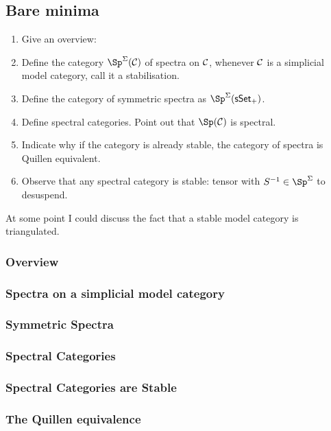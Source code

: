 \documentclass[11pt]{article}
\begin{document}
\begin{MichaelStableModelCats}
\subsection*{Bare minima}
\begin{enumerate}\squishlist
\item Give an overview:
\item Define the category $\Sp^\Sigma(\calC)$ of spectra on $\mathcal{C}$, whenever $\mathcal{C}$ is a simplicial model category, call it a stabilisation.
\item Define the category of symmetric spectra as $\Sp^\Sigma(\sSet_+)$.
\item Define spectral categories. Point out that $\Sp(\calC)$ is spectral.
\item Indicate why if the category is already stable, the category of spectra is Quillen equivalent.
\item Observe that any spectral category is stable: tensor with $S^{-1}\in\Sp^\Sigma$ to desuspend.
\end{enumerate}
At some point I could discuss the fact that a stable model category is triangulated.
\subsubsection{Overview}
\subsubsection{Spectra on a simplicial model category}
\subsubsection{Symmetric Spectra}
\subsubsection{Spectral Categories}
\subsubsection{Spectral Categories are Stable}
\subsubsection{The Quillen equivalence}

\end{MichaelStableModelCats}
\end{document}
